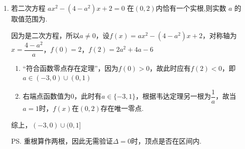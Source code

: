 \begin{enumerate}
\begin{jieda}
    \end{jieda}
    \item 若二次方程 ${ax^2} - \left( {4 - {a}^{2}}\right) x + 2 = 0$ 在$(0,2)$内恰有一个实根,则实数 $a$ 的取值范围为.
    \begin{jieda}
        因为是二次方程，所以$a \neq 0$，设$f(x) = {ax^2} - \left( {4 - {a}^{2}}\right) x + 2$，对称轴为$x = \dfrac{4-a^2}{a}$，$f(0) = 2$，$f(2) = 2a^2+4a-6$
        \begin{enumerate}[1.]
            \item “符合函数零点存在定理”，因为$f(0) > 0$，故此时应有$f(2) < 0$，即$a \in (-3, 0) \cup (0,1)$
            \item 右端点函数值为0，此时有$a \in \{-3, 1\}$，根据韦达定理另一根为$\dfrac{1}{a}$，故当$a = 1$时，$f(x)$在$(0, 2)$存在唯一零点.
        \end{enumerate}
        综上，$(-3,0)\cup (0, 1\rbrack$
        
        \ps 重根算作两根，因此无需验证$\Delta = 0$时，顶点是否在区间内.
    \end{jieda}


\end{enumerate}

